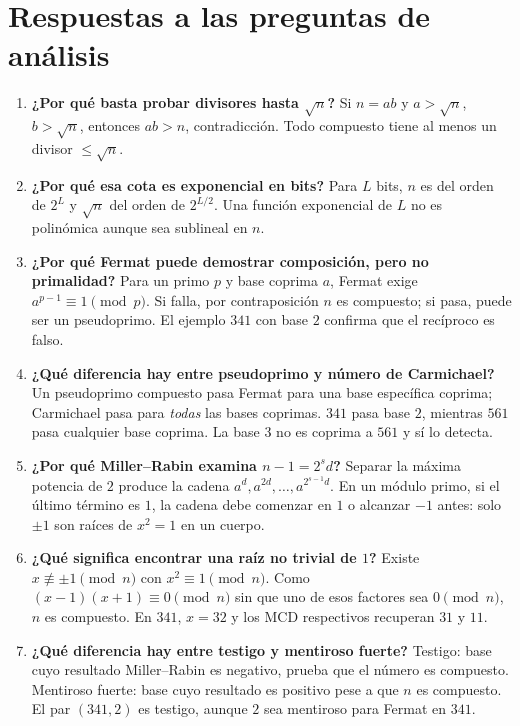 \section{Respuestas a las preguntas de análisis}
\begin{enumerate}
\item \textbf{¿Por qué basta probar divisores hasta $\sqrt n$?} Si $n=ab$ y $a>\sqrt n$, $b>\sqrt n$, entonces $ab>n$, contradicción. Todo compuesto tiene al menos un divisor $\le\sqrt n$.

\item \textbf{¿Por qué esa cota es exponencial en bits?} Para $L$ bits, $n$ es del orden de $2^L$ y $\sqrt n$ del orden de $2^{L/2}$. Una función exponencial de $L$ no es polinómica aunque sea sublineal en $n$.

\item \textbf{¿Por qué Fermat puede demostrar composición, pero no primalidad?} Para un primo $p$ y base coprima $a$, Fermat exige $a^{p-1}\equiv1\pmod p$. Si falla, por contraposición $n$ es compuesto; si pasa, puede ser un pseudoprimo. El ejemplo $341$ con base $2$ confirma que el recíproco es falso.

\item \textbf{¿Qué diferencia hay entre pseudoprimo y número de Carmichael?} Un pseudoprimo compuesto pasa Fermat para una base específica coprima; Carmichael pasa para \emph{todas} las bases coprimas. $341$ pasa base $2$, mientras $561$ pasa cualquier base coprima. La base $3$ no es coprima a $561$ y sí lo detecta.

\item \textbf{¿Por qué Miller--Rabin examina $n-1=2^sd$?} Separar la máxima potencia de $2$ produce la cadena $a^d,a^{2d},\ldots,a^{2^{s-1}d}$. En un módulo primo, si el último término es $1$, la cadena debe comenzar en $1$ o alcanzar $-1$ antes: solo $\pm1$ son raíces de $x^2=1$ en un cuerpo.

\item \textbf{¿Qué significa encontrar una raíz no trivial de $1$?} Existe $x\not\equiv\pm1\pmod n$ con $x^2\equiv1\pmod n$. Como $(x-1)(x+1)\equiv0\pmod n$ sin que uno de esos factores sea $0\pmod n$, $n$ es compuesto. En $341$, $x=32$ y los MCD respectivos recuperan $31$ y $11$.

\item \textbf{¿Qué diferencia hay entre testigo y mentiroso fuerte?} Testigo: base cuyo resultado Miller--Rabin es negativo, prueba que el número es compuesto. Mentiroso fuerte: base cuyo resultado es positivo pese a que $n$ es compuesto. El par $(341,2)$ es testigo, aunque $2$ sea mentiroso para Fermat en $341$.


\end{enumerate}
